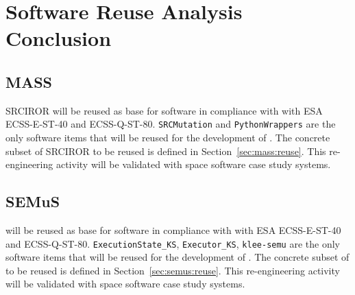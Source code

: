 
\chapter{Software Reuse Analysis Conclusion}

\section{MASS}

SRCIROR will be reused as base for \MASS software in compliance with with ESA ECSS-E-ST-40 and ECSS-Q-ST-80.
\texttt{SRCMutation} and \texttt{PythonWrappers} are the only software items that will be reused for the development of \MASS.
The concrete subset of SRCIROR to be reused is defined in Section~\ref{sec:mass:reuse}.
This re-engineering activity will be validated with space software case study systems.

\section{SEMuS}

\SEMU will be reused as base for \SEMUS software in compliance with with ESA ECSS-E-ST-40 and ECSS-Q-ST-80.
\texttt{ExecutionState\_KS}, \texttt{Executor\_KS}, \texttt{klee-semu} are the only software items that will be reused for the development of \SEMUS.
The concrete subset of \SEMU to be reused is defined in Section~\ref{sec:semus:reuse}.
This re-engineering activity will be validated with space software case study systems.

